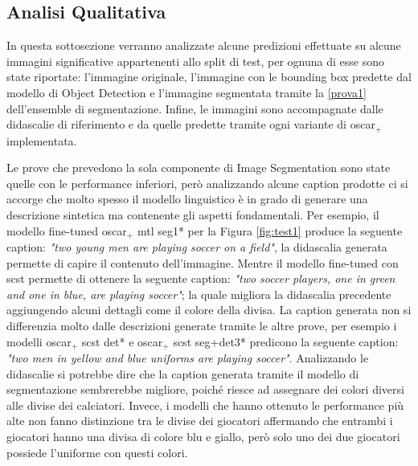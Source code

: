 \subsection{Analisi Qualitativa}\label{analisi_qualitativa}

In questa sottosezione verranno analizzate alcune predizioni effettuate su alcune immagini significative appartenenti allo split di test, per ognuna di esse sono state riportate: l'immagine originale, l'immagine con le bounding box predette dal modello di Object Detection e l'immagine segmentata tramite la \ref{prova1} dell'ensemble di segmentazione. Infine, le immagini sono accompagnate dalle didascalie di riferimento e da quelle predette tramite ogni variante di \acrshort{oscar}$_+$ implementata.



Le prove che prevedono la sola componente di Image Segmentation sono state quelle con le performance inferiori, però analizzando alcune caption prodotte ci si accorge che molto spesso il modello linguistico è in grado di generare una descrizione sintetica ma contenente gli aspetti fondamentali. Per esempio, il modello fine-tuned \acrshort{oscar}$_+$ \acrshort{mtl} seg1* per la Figura \ref{fig:test1} produce la seguente caption: \textit{"two young men are playing soccer on a field"}, la didascalia generata permette di capire il contenuto dell'immagine. Mentre il modello fine-tuned con \acrshort{scst} permette di ottenere la seguente caption: \textit{"two soccer players, one in green and one in blue, are playing soccer"}; la quale migliora la didascalia precedente aggiungendo alcuni dettagli come il colore della divisa. La caption generata non si differenzia molto dalle descrizioni generate tramite le altre prove, per esempio i modelli \acrshort{oscar}$_+$ \acrshort{scst} det* e \acrshort{oscar}$_+$ \acrshort{scst} seg+det3* predicono la seguente caption: \textit{"two men in yellow and blue uniforms are playing soccer"}. Analizzando le didascalie si potrebbe dire che la caption generata tramite il modello di segmentazione sembrerebbe migliore, poiché riesce ad assegnare dei colori diversi alle divise dei calciatori. Invece, i modelli che hanno ottenuto le performance più alte non fanno distinzione tra le divise dei giocatori affermando che entrambi i giocatori hanno una divisa di colore blu e giallo, però solo uno dei due giocatori possiede l'uniforme con questi colori.


